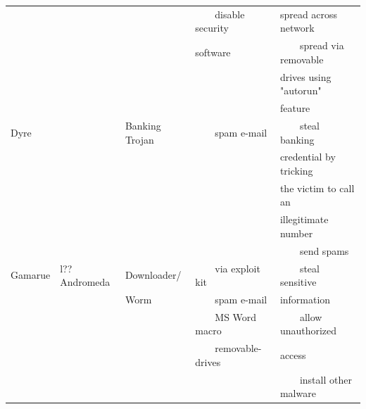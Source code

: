 \documentclass[12pt]{article}
\newcommand{\tabitem}{~~\llap{\textbullet}~~}
\begin{document}
\begin{table}[!htbp]
\begin{tabular}{lllll}
&&&\tabitem disable security &spread across network \\
&&&software &\tabitem spread via removable \\
&&&&drives using "autorun" \\
&&&&feature \\
Dyre &  &Banking Trojan &\tabitem spam e-mail  &\tabitem steal banking \\
&&&&credential by tricking \\
&&&&the victim to call an \\
&&&&illegitimate number \\
&&&&\tabitem send spams \\
Gamarue &l?? Andromeda  &Downloader/ &\tabitem via exploit kit &\tabitem steal sensitive \\
&  &Worm   &\tabitem spam e-mail &information \\
&&&\tabitem MS Word macro &\tabitem allow unauthorized \\
&&&\tabitem removable-drives &access \\
&&&&\tabitem install other malware  \\
\hline
\end{tabular}
\end{table}
\end{document}
